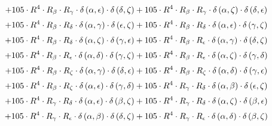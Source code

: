 \begin{subequations}
\begin{gather}
 \\[0.2em] \notag 		 + 105 \cdot R^{4} \cdot R_{\beta{}} \cdot R_{\gamma{}} \cdot \delta{}\left(\alpha{}, \epsilon{}\right) \cdot \delta{}\left(\delta{}, \zeta{}\right)+ 105 \cdot R^{4} \cdot R_{\beta{}} \cdot R_{\gamma{}} \cdot \delta{}\left(\alpha{}, \zeta{}\right) \cdot \delta{}\left(\delta{}, \epsilon{}\right) 
 \\[0.2em] \notag 		 + 105 \cdot R^{4} \cdot R_{\beta{}} \cdot R_{\delta{}} \cdot \delta{}\left(\alpha{}, \gamma{}\right) \cdot \delta{}\left(\epsilon{}, \zeta{}\right)+ 105 \cdot R^{4} \cdot R_{\beta{}} \cdot R_{\delta{}} \cdot \delta{}\left(\alpha{}, \epsilon{}\right) \cdot \delta{}\left(\gamma{}, \zeta{}\right) 
 \\[0.2em] \notag 		 + 105 \cdot R^{4} \cdot R_{\beta{}} \cdot R_{\delta{}} \cdot \delta{}\left(\alpha{}, \zeta{}\right) \cdot \delta{}\left(\gamma{}, \epsilon{}\right)+ 105 \cdot R^{4} \cdot R_{\beta{}} \cdot R_{\epsilon{}} \cdot \delta{}\left(\alpha{}, \gamma{}\right) \cdot \delta{}\left(\delta{}, \zeta{}\right) 
 \\[0.2em] \notag 		 + 105 \cdot R^{4} \cdot R_{\beta{}} \cdot R_{\epsilon{}} \cdot \delta{}\left(\alpha{}, \delta{}\right) \cdot \delta{}\left(\gamma{}, \zeta{}\right)+ 105 \cdot R^{4} \cdot R_{\beta{}} \cdot R_{\epsilon{}} \cdot \delta{}\left(\alpha{}, \zeta{}\right) \cdot \delta{}\left(\gamma{}, \delta{}\right) 
 \\[0.2em] \notag 		 + 105 \cdot R^{4} \cdot R_{\beta{}} \cdot R_{\zeta{}} \cdot \delta{}\left(\alpha{}, \gamma{}\right) \cdot \delta{}\left(\delta{}, \epsilon{}\right)+ 105 \cdot R^{4} \cdot R_{\beta{}} \cdot R_{\zeta{}} \cdot \delta{}\left(\alpha{}, \delta{}\right) \cdot \delta{}\left(\gamma{}, \epsilon{}\right) 
 \\[0.2em] \notag 		 + 105 \cdot R^{4} \cdot R_{\beta{}} \cdot R_{\zeta{}} \cdot \delta{}\left(\alpha{}, \epsilon{}\right) \cdot \delta{}\left(\gamma{}, \delta{}\right)+ 105 \cdot R^{4} \cdot R_{\gamma{}} \cdot R_{\delta{}} \cdot \delta{}\left(\alpha{}, \beta{}\right) \cdot \delta{}\left(\epsilon{}, \zeta{}\right) 
 \\[0.2em] \notag 		 + 105 \cdot R^{4} \cdot R_{\gamma{}} \cdot R_{\delta{}} \cdot \delta{}\left(\alpha{}, \epsilon{}\right) \cdot \delta{}\left(\beta{}, \zeta{}\right)+ 105 \cdot R^{4} \cdot R_{\gamma{}} \cdot R_{\delta{}} \cdot \delta{}\left(\alpha{}, \zeta{}\right) \cdot \delta{}\left(\beta{}, \epsilon{}\right) 
 \\[0.2em] \notag 		 + 105 \cdot R^{4} \cdot R_{\gamma{}} \cdot R_{\epsilon{}} \cdot \delta{}\left(\alpha{}, \beta{}\right) \cdot \delta{}\left(\delta{}, \zeta{}\right)+ 105 \cdot R^{4} \cdot R_{\gamma{}} \cdot R_{\epsilon{}} \cdot \delta{}\left(\alpha{}, \delta{}\right) \cdot \delta{}\left(\beta{}, \zeta{}\right) 

\end{gather}
\end{subequations}

